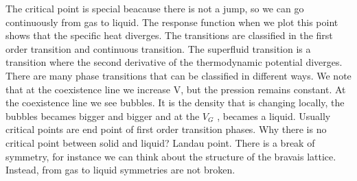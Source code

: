 \documentclass[../main/main.tex]{subfiles}
\begin{document}
The critical point is special beacause there is not a jump, so we can go continuously from gas to liquid. The response function when we plot this point shows that the specific heat diverges.
The transitions are classified in the first order transition and continuous transition. The superfluid transition is a transition where the second derivative of the thermodynamic potential diverges. There are many phase transitions that can be classified in different ways.
We note that at the coexistence line we increase V, but the pression remains constant. At the coexistence line we see bubbles. It is the density that is changing locally, the bubbles becames bigger and bigger and at the \( V_G \) , becames a liquid.
Usually critical points are end point of first order transition phases. Why there is no critical point between solid and liquid? Landau point. There is a break of symmetry, for instance we can think about the structure of the bravais lattice. Instead, from gas to liquid symmetries are not broken.
\end{document}
